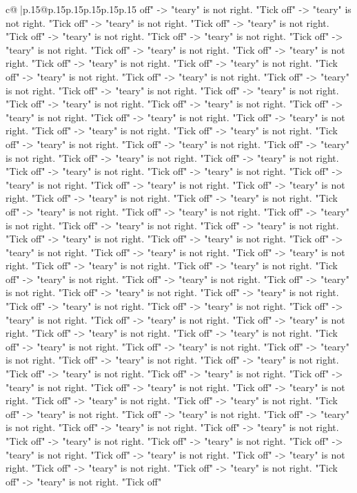 \documentclass{article}
\begin{document}
{\begin{supertabular}{c@{$\;$}|p{.15\linewidth}@{}p{.15\linewidth}p{.15\linewidth}p{.15\linewidth}p{.15\linewidth}p{.15\linewidth}}
{{{off" {-}> "teary" is not right. "Tick off" {-}> "teary" is not right. "Tick off" {-}> "teary" is not right. "Tick off" {-}> "teary" is not right. "Tick off" {-}> "teary" is not right. "Tick off" {-}> "teary" is not right. "Tick off" {-}> "teary" is not right. "Tick off" {-}> "teary" is not right. "Tick off" {-}> "teary" is not right. "Tick off" {-}> "teary" is not right. "Tick off" {-}> "teary" is not right. "Tick off" {-}> "teary" is not right. "Tick off" {-}> "teary" is not right. "Tick off" {-}> "teary" is not right. "Tick off" {-}> "teary" is not right. "Tick off" {-}> "teary" is not right. "Tick off" {-}> "teary" is not right. "Tick off" {-}> "teary" is not right. "Tick off" {-}> "teary" is not right. "Tick off" {-}> "teary" is not right. "Tick off" {-}> "teary" is not right. "Tick off" {-}> "teary" is not right. "Tick off" {-}> "teary" is not right. "Tick off" {-}> "teary" is not right. "Tick off" {-}> "teary" is not right. "Tick off" {-}> "teary" is not right. "Tick off" {-}> "teary" is not right. "Tick off" {-}> "teary" is not right. "Tick off" {-}> "teary" is not right. "Tick off" {-}> "teary" is not right. "Tick off" {-}> "teary" is not right. "Tick off" {-}> "teary" is not right. "Tick off" {-}> "teary" is not right. "Tick off" {-}> "teary" is not right. "Tick off" {-}> "teary" is not right. "Tick off" {-}> "teary" is not right. "Tick off" {-}> "teary" is not right. "Tick off" {-}> "teary" is not right. "Tick off" {-}> "teary" is not right. "Tick off" {-}> "teary" is not right. "Tick off" {-}> "teary" is not right. "Tick off" {-}> "teary" is not right. "Tick off" {-}> "teary" is not right. "Tick off" {-}> "teary" is not right. "Tick off" {-}> "teary" is not right. "Tick off" {-}> "teary" is not right. "Tick off" {-}> "teary" is not right. "Tick off" {-}> "teary" is not right. "Tick off" {-}> "teary" is not right. "Tick off" {-}> "teary" is not right. "Tick off" {-}> "teary" is not right. "Tick off" {-}> "teary" is not right. "Tick off" {-}> "teary" is not right. "Tick off" {-}> "teary" is not right. "Tick off" {-}> "teary" is not right. "Tick off" {-}> "teary" is not right. "Tick off" {-}> "teary" is not right. "Tick off" {-}> "teary" is not right. "Tick off" {-}> "teary" is not right. "Tick off" {-}> "teary" is not right. "Tick off" {-}> "teary" is not right. "Tick off" {-}> "teary" is not right. "Tick off" {-}> "teary" is not right. "Tick off" {-}> "teary" is not right. "Tick off" {-}> "teary" is not right. "Tick off" {-}> "teary" is not right. "Tick off" {-}> "teary" is not right. "Tick off" {-}> "teary" is not right. "Tick off" {-}> "teary" is not right. "Tick off" {-}> "teary" is not right. "Tick off" {-}> "teary" is not right. "Tick off" {-}> "teary" is not right. "Tick off" {-}> "teary" is not right. "Tick off" {-}> "teary" is not right. "Tick off" {-}> "teary" is not right. "Tick off" {-}> "teary" is not right. "Tick off" {-}> "teary" is not right. "Tick off" {-}> "teary" is not right. "Tick off" {-}> "teary" is not right. "Tick off" {-}> "teary" is not right. "Tick off" {-}> "teary" is not right. "Tick off" {-}> "teary" is not right. "Tick off" {-}> "teary" is not right. "Tick off" {-}> "teary" is not right. "Tick off" }}}
\end{supertabular}}
\end{document}
